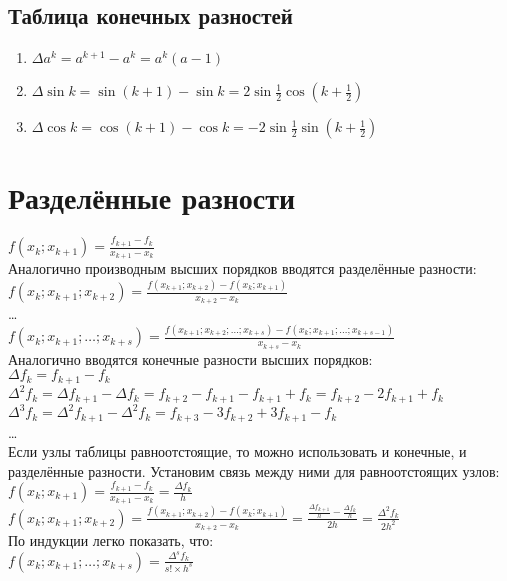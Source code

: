 \documentclass[a4paper,11pt]{article}
\begin{document}
  \subsection{Таблица конечных разностей}
  \begin{enumerate}
    \item \(\Delta a^k = a^{k+1} - a^k = a^k(a-1)\)
    \item \(\Delta \sin{k} = \sin{(k+1)} - \sin{k} = 2\sin{\frac{1}{2}}\cos{(k+\frac{1}{2})} \)
    \item \(\Delta \cos{k} = \cos{(k+1)} - \cos{k} = -2\sin{\frac{1}{2}}\sin{(k+\frac{1}{2})} \)
  \end{enumerate}

\section{Разделённые разности}
\(f(x_k; x_{k+1}) = \frac{f_{k+1} - f_k}{x_{k+1} - x_k}\) \\
\vspace{5mm}
Аналогично производным высших порядков вводятся разделённые разности: \\
\(f(x_k; x_{k+1}; x_{k+2}) = \frac{f(x_{k+1}; x_{k+2}) - f(x_k; x_{k+1})}{x_{k+2} - x_k}\) \\
\dots \\
\(f(x_k; x_{k+1}; \dots; x_{k+s}) = \frac{f(x_{k+1}; x_{k+2}; \dots; x_{k+s})
    - f(x_k; x_{k+1}; \dots; x_{k+s-1})}{x_{k+s} - x_k}\) \\
\vspace{5mm}
Аналогично вводятся конечные разности высших порядков: \\
\vspace{5mm}
\(\Delta f_k = f_{k+1} - f_k\) \\
\(\Delta^2 f_k = \Delta f_{k+1} - \Delta f_k = f_{k+2} - f_{k+1} - f_{k+1} + f_k = f_{k+2} - 2f_{k+1} + f_k\) \\
\(\Delta^3 f_k = \Delta^2 f_{k+1} - \Delta^2 f_k = f_{k+3} - 3f_{k+2} + 3f_{k+1} - f_k\) \\
\dots \\
\vspace{5mm}
Если узлы таблицы равноотстоящие, то можно использовать и конечные, и разделённые разности.
Установим связь между ними для равноотстоящих узлов: \\
\vspace{5mm}
\(f(x_k; x_{k+1}) = \frac{f_{k+1} - f_k}{x_{k+1} - x_k} = \frac{\Delta f_k}{h}\) \\
\(f(x_k; x_{k+1}; x_{k+2}) = \frac{f(x_{k+1}; x_{k+2}) - f(x_k; x_{k+1})}{x_{k+2} - x_k}
    = \frac{\frac{\Delta f_{k+1}}{h} - \frac{\Delta f_k}{h}}{2h} = \frac{\Delta^2 f_k}{2h^2}\) \\
\vspace{5mm}
По индукции легко показать, что: \\
\(f(x_k; x_{k+1}; \dots; x_{k+s}) = \frac{\Delta^s f_k}{s! \times h^s}\)
\end{document}
